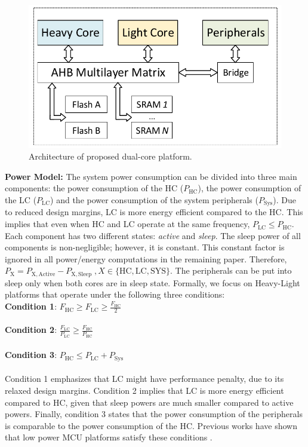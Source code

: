 \begin{figure}[!tbp]
	\centering
	\includegraphics[width=0.7\linewidth]{./figures/system_model}
	\caption{Architecture of proposed dual-core platform.}
	\label{fig:system_model}
\end{figure}

\noindent\textbf{Power Model: }The system power consumption can be divided into three main components: the power consumption of the HC ($P_\mathrm{HC}$), the power consumption of the LC ($P_\mathrm{LC}$) and the power consumption of the system peripherals ($P_\mathrm{Sys}$). Due to reduced design margins, LC is more energy efficient compared to the HC. This implies that even when HC and LC operate at the same frequency, $P_\mathrm{LC}\leq P_\mathrm{HC}$. Each component has two different states: \emph{active} and \emph{sleep}. The sleep power of all components is non-negligible; however, it is constant. This constant factor is ignored in all power/energy computations in the remaining paper. Therefore, $P_\mathrm{X}=P_\mathrm{X,Active} - P_\mathrm{X,Sleep}\;, X\in\{\mathrm{HC}, \mathrm{LC}, \mathrm{SYS}\}$. The peripherals can be put into sleep only when both cores are in sleep state. 
Formally, we focus on Heavy-Light platforms that operate under the following three conditions:\\
\textbf{Condition 1}: $F_\mathrm{HC}\geq F_\mathrm{LC}\geq \displaystyle\frac{ F_\mathrm{HC}}{2}$\\\\
\textbf{Condition 2}: $\displaystyle\frac{F_\mathrm{LC}}{P_\mathrm{LC}}\geq \displaystyle\frac{F_\mathrm{HC}}{P_\mathrm{HC}}$\\\\ 
\textbf{Condition 3}: $P_{\mathrm{HC}}\leq P_{\mathrm{LC}}+ P_{\mathrm{Sys}}$\\\\
Condition 1 emphasizes that LC might have performance penalty, due to its relaxed design margins. Condition 2 implies that LC is more energy efficient compared to HC, given that sleep powers are much smaller compared to active powers. Finally, condition 3 states that the power consumption of the peripherals is comparable to the power consumption of the HC. Previous works have shown that low power MCU platforms satisfy these conditions \cite{Gomez1, Fuks}.

